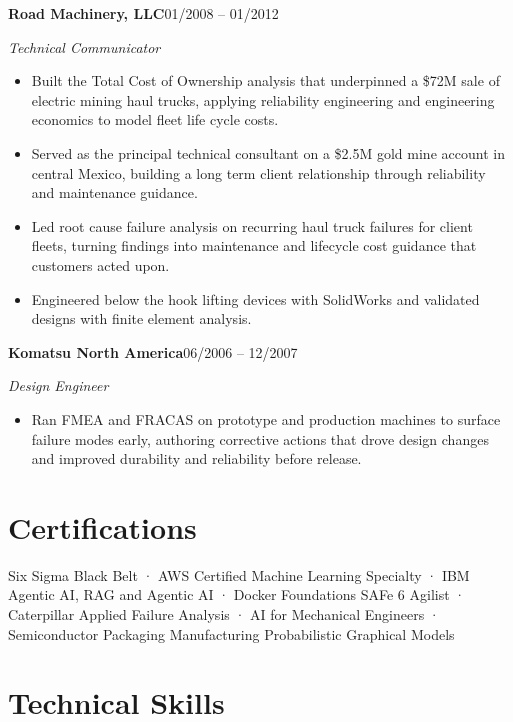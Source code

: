\documentclass[10pt]{article}
\newcommand{\companyentry}[3]{%
  \smallskip\textbf{#1}\hspace{0.4em}{\color{slate}\small #2}\hfill{\color{slate}\small #3}\par}
\newcommand{\role}[1]{\textit{#1}\par\vspace{1pt}}
\begin{document}
\companyentry{Road Machinery, LLC}{Phoenix, AZ}{01/2008 -- 01/2012}
\role{Technical Communicator}
\begin{itemize}
    \item Built the Total Cost of Ownership analysis that underpinned a \$72M sale of electric mining haul trucks, applying reliability engineering and engineering economics to model fleet life cycle costs.
    \item Served as the principal technical consultant on a \$2.5M gold mine account in central Mexico, building a long term client relationship through reliability and maintenance guidance.
    \item Led root cause failure analysis on recurring haul truck failures for client fleets, turning findings into maintenance and lifecycle cost guidance that customers acted upon.
    \item Engineered below the hook lifting devices with SolidWorks and validated designs with finite element analysis.
\end{itemize}

\companyentry{Komatsu North America}{Chattanooga, TN}{06/2006 -- 12/2007}
\role{Design Engineer}
\begin{itemize}
    \item Ran FMEA and FRACAS on prototype and production machines to surface failure modes early, authoring corrective actions that drove design changes and improved durability and reliability before release.
\end{itemize}

\section{Certifications}
Six Sigma Black Belt · AWS Certified Machine Learning Specialty · IBM Agentic AI, RAG and Agentic AI · Docker Foundations
SAFe 6 Agilist · Caterpillar Applied Failure Analysis · AI for Mechanical Engineers · Semiconductor Packaging Manufacturing
Probabilistic Graphical Models

\section{Technical Skills}
\end{document}
